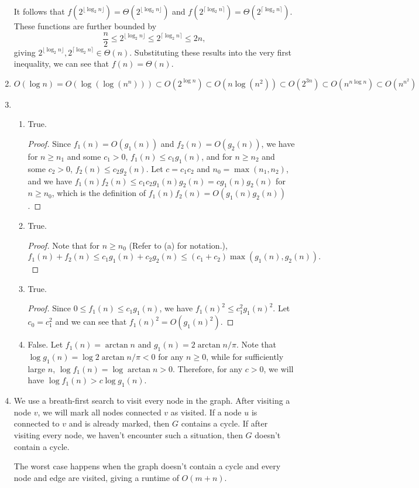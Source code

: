 \documentclass{article}
\begin{document}
\begin{enumerate}
	It follows that $f(2^{\lfloor\log_2 n\rfloor}) = \Theta(2^{\lfloor\log_2 n\rfloor})$ and $f(2^{\lceil\log_2 n\rceil}) = \Theta(2^{\lceil\log_2 n\rceil})$. These functions are further bounded by
	\[
		\frac{n}{2} \le 2^{\lfloor\log_2 n\rfloor} \le 2^{\lceil\log_2 n\rceil} \le 2n,
	\]
	giving $2^{\lfloor\log_2 n\rfloor}, 2^{\lceil\log_2 n\rceil} \in \Theta(n)$. Substituting these results into the very first inequality, we can see that $f(n) = \Theta(n)$.
	\item $O(\log n) = O(\log(\log(n^n))) \subset O(2^{\log n}) \subset O(n\log(n^2)) \subset O(2^{3n}) \subset O(n^{n\log n}) \subset O(n^{n^2})$
	\item
	\begin{enumerate}
		\item True.
		\begin{proof}
			Since $f_1(n) = O(g_1(n))$ and $f_2(n) = O(g_2(n))$, we have for $n \ge n_1$ and some $c_1 > 0$, $f_1(n) \le c_1g_1(n)$, and for $n \ge n_2$ and some $c_2 > 0$, $f_2(n) \le c_2g_2(n)$. Let $c = c_1c_2$ and $n_0 = \max(n_1, n_2)$, and we have $f_1(n)f_2(n) \le c_1c_2g_1(n)g_2(n) = cg_1(n)g_2(n)$ for $n \ge n_0$, which is the definition of $f_1(n)f_2(n) = O(g_1(n)g_2(n))$.
		\end{proof}
		\item True.
		\begin{proof}
            Note that for $n \ge n_0$ (Refer to (a) for notation.),
            \[
                f_1(n) + f_2(n) \le c_1g_1(n) + c_2g_2(n) \le (c_1 + c_2)\max(g_1(n), g_2(n)).
            \]
        \end{proof}
		\item True.
		\begin{proof}
            Since $0 \le f_1(n) \le c_1g_1(n)$, we have $f_1(n)^2 \le c_1^2g_1(n)^2$. Let $c_0 = c_1^2$ and we can see that $f_1(n)^2 = O(g_1(n)^2)$.
        \end{proof}
        \item False. Let $f_1(n) = \arctan n$ and $g_1(n) = 2\arctan n/\pi$. Note that $\log g_1(n) = \log 2\arctan n/\pi < 0$ for any $n \ge 0$, while for sufficiently large $n$, $\log f_1(n) = \log\arctan n > 0$. Therefore, for any $c > 0$, we will have $\log f_1(n) > c\log g_1(n)$.
	\end{enumerate}
	\item We use a breath-first search to visit every node in the graph. After visiting a node $v$, we will mark all nodes connected $v$ as visited. If a node $u$ is connected to $v$ and is already marked, then $G$ contains a cycle. If after visiting every node, we haven't encounter such a situation, then $G$ doesn't contain a cycle.
	
	The worst case happens when the graph doesn't contain a cycle and every node and edge are visited,  giving a runtime of $O(m + n)$.
\end{enumerate}
\end{document}
